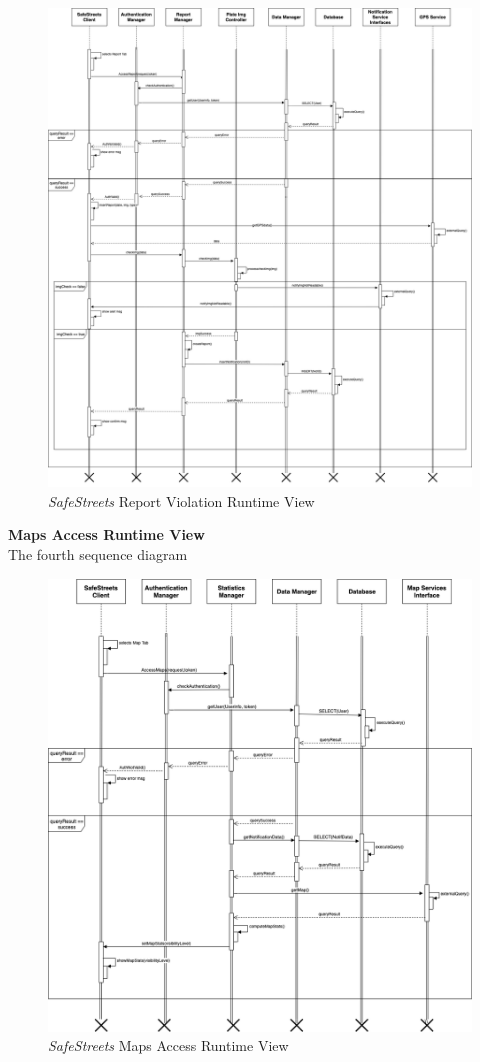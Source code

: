 \documentclass{article}
\begin{document}
	\begin{figure}[H]
			\centering
			\includegraphics[scale=0.25]{Images/Diagrams/Runtime/report_runtime.png}
			\caption{{\it SafeStreets} Report Violation Runtime View}
	\end{figure}
	\pagebreak
	\noindent
	{\bf Maps Access Runtime View} \\
	The fourth sequence diagram \\
	\begin{figure}[H]
			\centering
			\includegraphics[scale=0.25]{Images/Diagrams/Runtime/maps_runtime.png}
			\caption{{\it SafeStreets} Maps Access Runtime View}
	\end{figure}
\end{document}
